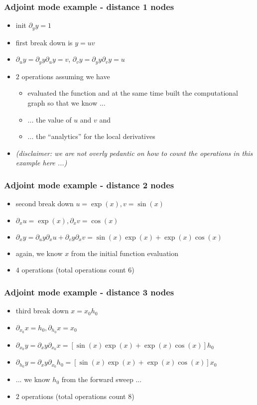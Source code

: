 \documentclass[10pt,German]{beamer}
\begin{document}
\begin{frame}[fragile]
\frametitle{Adjoint mode example - distance 1 nodes}
\begin{itemize}
\item init $\partial_y y = 1$
\item first break down is $y = uv$
\item $\partial_u y = \partial_y y \partial _u y = v$, $\partial_v y = \partial_y y \partial _v y = u$
\item $2$ operations assuming we have
\begin{itemize}
\item evaluated the function and at the same time built the computational graph so that we know ...
\item ... the value of $u$ and $v$ and
\item ... the ``analytics'' for the local derivatives
\end{itemize}
\item \textit{(disclaimer: we are not overly pedantic on how to count the operations in this example here ...)}
\end{itemize}
\end{frame}

\begin{frame}[fragile]
\frametitle{Adjoint mode example - distance 2 nodes}
\begin{itemize}
\item second break down $u = \exp(x), v= \sin(x)$
\item $\partial_x u = \exp(x), \partial_x v = \cos(x)$
\item $\partial_x y = \partial_u y \partial_x u + \partial_v y \partial_x v = \sin(x)\exp(x)+\exp(x)\cos(x)$
\item again, we know $x$ from the initial function evaluation
\item $4$ operations (total operations count $6$)
\end{itemize}
\end{frame}

\begin{frame}[fragile]
\frametitle{Adjoint mode example - distance 3 nodes}
\begin{itemize}
\item third break down $x = x_0 h_0$
\item $\partial_{x_0} x = h_0, \partial_{h_0} x = x_0$
\item $\partial_{x_0} y = \partial_x y \partial_{x_0} x = [\sin(x)\exp(x)+\exp(x)\cos(x)] h_0$
\item $\partial_{h_0} y = \partial_x y \partial_{x_0} h_0 = [\sin(x)\exp(x)+\exp(x)\cos(x)] x_0$
\item ... we know $h_0$ from the forward sweep ...
\item $2$ operations (total operations count $8$)
\end{itemize}
\end{frame}
\end{document}
